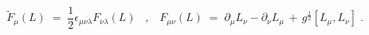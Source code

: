 \begin{equation}\label{eq:defFt}
{\tilde F}_\mu (L) \;=\; \frac{1}{2}\epsilon_{\mu\nu\lambda} F_{\nu\lambda}(L)
\;\;\;,\;\;\;
F_{\mu\nu}(L) \;=\; \partial_\mu L_\nu - \partial_\nu L_\mu
\,+\, g^{\frac{1}{2}} [L_\mu , L_\nu ] \;.
\end{equation}

